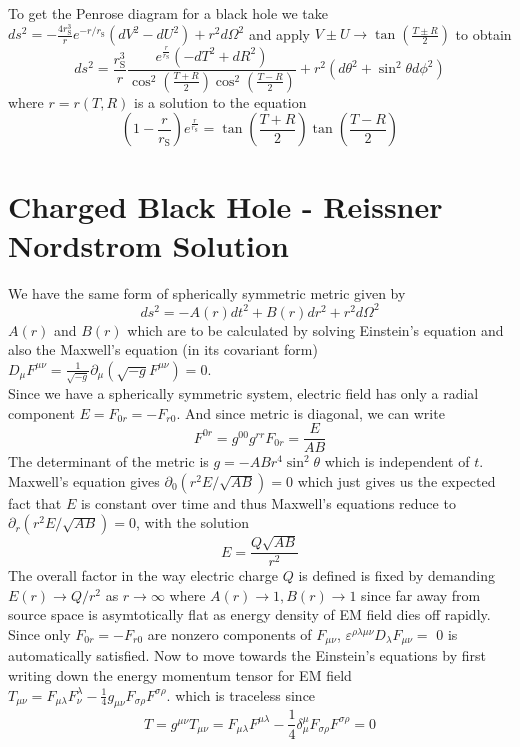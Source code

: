 ﻿\documentclass[12pt,a4paper]{article}
\begin{document}
To get the Penrose diagram for a black hole we take $d s^{2}=-\frac{4 r_{\mathrm{S}}^{3}}{r} e^{-r / r_{\mathrm{S}}}\left(d V^{2}-d U^{2}\right)+r^{2} d \Omega^{2}$ and apply $V\pm U \rightarrow \tan(\frac{T\pm R}{2})$ to obtain 
$$
d s^{2}=\frac{r_{\mathrm{S}}^{3}}{r} \frac{e^{\frac{r}{r_{\mathrm{S}}}}\left(-dT^{2}+dR^{2}\right)}{\cos ^{2}(\frac{T+R}{2}) \cos ^{2}(\frac{T-R}{2})}+r^{2}\left(d \theta^{2}+\sin ^{2} \theta d \phi^{2}\right)
$$
where $r=r(T,R)$ is a solution to the equation 
$$
\left(1-\frac{r}{r_{\mathrm{S}}}\right) e^{\frac{r}{r_{\mathrm{S}}}}=\tan\left(\frac{T+R}{2}\right) \tan\left(\frac{T-R}{2}\right)
$$


\section{Charged Black Hole - Reissner Nordstrom Solution}
We have the same form of spherically symmetric metric given by 
$$d s^{2}=-A(r) d t^{2}+B(r) d r^{2}+r^{2} d \Omega^{2}$$
 $A(r)$ and $B(r)$ which are to be calculated by solving Einstein's equation and also the Maxwell's equation (in its covariant form) $D_{\mu} F^{\mu \nu}=\frac{1}{\sqrt{-g}} \partial_{\mu}\left(\sqrt{-g} F^{\mu \nu}\right)=0 .$ \\
Since we have a spherically symmetric system, electric field has only a radial component $E=F_{0 r}=-F_{r 0}$. And since metric is diagonal, we can write $$F^{0 r}=g^{00} g^{r r} F_{0 r}=\frac{E}{A B}$$
The determinant of the metric is $g=-A B r^{4} \sin ^{2} \theta$ which is independent of $t$. Maxwell's equation gives $\partial_{0}\left(r^{2} E / \sqrt{A B}\right)=0$ which just gives us the expected fact that $E$ is constant over time and thus Maxwell's equations reduce to $\partial_{r}\left(r^{2} E / \sqrt{A B}\right)=0$, with the solution
$$
E=\frac{Q \sqrt{A B}}{r^{2}}
$$
The overall factor in the way electric charge $Q$ is defined is fixed by demanding $E(r) \rightarrow Q / r^{2}$ as $r \rightarrow \infty$ where $A(r) \rightarrow 1, B(r) \rightarrow 1$ since far away from source space is asymtotically flat as energy density of EM field dies off rapidly. Since only $F_{0 r}=-F_{r 0}$ are nonzero components of $F_{\mu \nu}$, $\varepsilon^{\rho \lambda \mu \nu} D_{\lambda} F_{\mu \nu}=$ 0 is automatically satisfied. Now to move towards the Einstein's equations by first writing down the energy momentum tensor for EM field $T_{\mu \nu}=F_{\mu \lambda} F_{\nu}^{\lambda}-\frac{1}{4} g_{\mu \nu} F_{\sigma \rho} F^{\sigma \rho} .$ which is traceless since
$$T=g^{\mu \nu}T_{\mu \nu}=F_{\mu \lambda} F^{\mu \lambda}-\frac{1}{4} \delta^{\mu}_{\mu} F_{\sigma \rho} F^{\sigma \rho}=0$$
\end{document}
